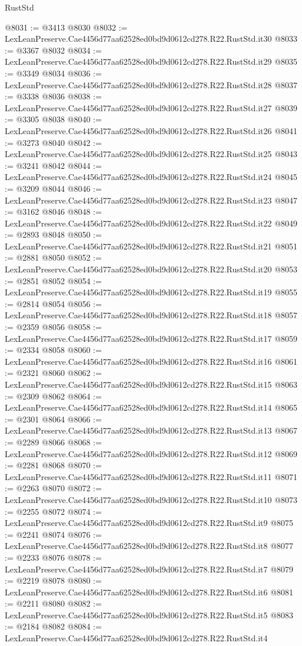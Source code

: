 \begin{lexlean}{RustStd}
\begin{coremodule}
@8031 := @3413 @8030
@8032 := LexLeanPreserve.Cae4456d77aa62528ed0bd9d0612cd278.R22.RustStd.it30
@8033 := @3367 @8032
@8034 := LexLeanPreserve.Cae4456d77aa62528ed0bd9d0612cd278.R22.RustStd.it29
@8035 := @3349 @8034
@8036 := LexLeanPreserve.Cae4456d77aa62528ed0bd9d0612cd278.R22.RustStd.it28
@8037 := @3338 @8036
@8038 := LexLeanPreserve.Cae4456d77aa62528ed0bd9d0612cd278.R22.RustStd.it27
@8039 := @3305 @8038
@8040 := LexLeanPreserve.Cae4456d77aa62528ed0bd9d0612cd278.R22.RustStd.it26
@8041 := @3273 @8040
@8042 := LexLeanPreserve.Cae4456d77aa62528ed0bd9d0612cd278.R22.RustStd.it25
@8043 := @3241 @8042
@8044 := LexLeanPreserve.Cae4456d77aa62528ed0bd9d0612cd278.R22.RustStd.it24
@8045 := @3209 @8044
@8046 := LexLeanPreserve.Cae4456d77aa62528ed0bd9d0612cd278.R22.RustStd.it23
@8047 := @3162 @8046
@8048 := LexLeanPreserve.Cae4456d77aa62528ed0bd9d0612cd278.R22.RustStd.it22
@8049 := @2893 @8048
@8050 := LexLeanPreserve.Cae4456d77aa62528ed0bd9d0612cd278.R22.RustStd.it21
@8051 := @2881 @8050
@8052 := LexLeanPreserve.Cae4456d77aa62528ed0bd9d0612cd278.R22.RustStd.it20
@8053 := @2851 @8052
@8054 := LexLeanPreserve.Cae4456d77aa62528ed0bd9d0612cd278.R22.RustStd.it19
@8055 := @2814 @8054
@8056 := LexLeanPreserve.Cae4456d77aa62528ed0bd9d0612cd278.R22.RustStd.it18
@8057 := @2359 @8056
@8058 := LexLeanPreserve.Cae4456d77aa62528ed0bd9d0612cd278.R22.RustStd.it17
@8059 := @2334 @8058
@8060 := LexLeanPreserve.Cae4456d77aa62528ed0bd9d0612cd278.R22.RustStd.it16
@8061 := @2321 @8060
@8062 := LexLeanPreserve.Cae4456d77aa62528ed0bd9d0612cd278.R22.RustStd.it15
@8063 := @2309 @8062
@8064 := LexLeanPreserve.Cae4456d77aa62528ed0bd9d0612cd278.R22.RustStd.it14
@8065 := @2301 @8064
@8066 := LexLeanPreserve.Cae4456d77aa62528ed0bd9d0612cd278.R22.RustStd.it13
@8067 := @2289 @8066
@8068 := LexLeanPreserve.Cae4456d77aa62528ed0bd9d0612cd278.R22.RustStd.it12
@8069 := @2281 @8068
@8070 := LexLeanPreserve.Cae4456d77aa62528ed0bd9d0612cd278.R22.RustStd.it11
@8071 := @2263 @8070
@8072 := LexLeanPreserve.Cae4456d77aa62528ed0bd9d0612cd278.R22.RustStd.it10
@8073 := @2255 @8072
@8074 := LexLeanPreserve.Cae4456d77aa62528ed0bd9d0612cd278.R22.RustStd.it9
@8075 := @2241 @8074
@8076 := LexLeanPreserve.Cae4456d77aa62528ed0bd9d0612cd278.R22.RustStd.it8
@8077 := @2233 @8076
@8078 := LexLeanPreserve.Cae4456d77aa62528ed0bd9d0612cd278.R22.RustStd.it7
@8079 := @2219 @8078
@8080 := LexLeanPreserve.Cae4456d77aa62528ed0bd9d0612cd278.R22.RustStd.it6
@8081 := @2211 @8080
@8082 := LexLeanPreserve.Cae4456d77aa62528ed0bd9d0612cd278.R22.RustStd.it5
@8083 := @2184 @8082
@8084 := LexLeanPreserve.Cae4456d77aa62528ed0bd9d0612cd278.R22.RustStd.it4

\end{coremodule}
\end{lexlean}
